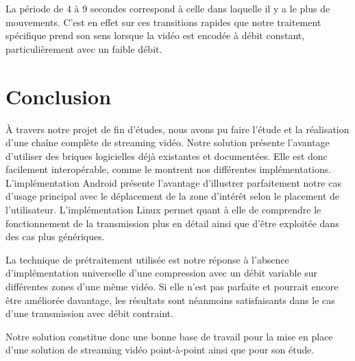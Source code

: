 \documentclass[11pt,a4paper]{article}
\begin{document}
\bigbreak
La période de 4 à 9 secondes correspond à celle dans laquelle il y a le plus de mouvements.
C'est en effet sur ces transitions rapides que notre traitement spécifique prend son sens lorsque la vidéo est encodée à débit constant, particulièrement avec un faible débit.

\section{Conclusion}
À travers notre projet de fin d'études, nous avons pu faire l'étude et la réalisation d'une chaîne complète de streaming vidéo.
Notre solution présente l'avantage d'utiliser des briques logicielles déjà existantes et documentées.
Elle est donc facilement interopérable, comme le montrent nos différentes implémentations.
L'implémentation Android présente l'avantage d'illustrer parfaitement notre cas d'usage principal avec le déplacement de la zone d'intérêt selon le placement de l'utilisateur.
L'implémentation Linux permet quant à elle de comprendre le fonctionnement de la transmission plus en détail ainsi que d'être exploitée dans des cas plus génériques.

\bigbreak
La technique de prétraitement utilisée est notre réponse à l'absence d'implémentation universelle d'une compression avec un débit variable sur différentes zones d'une même vidéo.
Si elle n'est pas parfaite et pourrait encore être améliorée davantage, les résultats sont néanmoins satisfaisants dans le cas d'une transmission avec débit contraint.

\bigbreak
Notre solution constitue donc une bonne base de travail pour la mise en place d'une solution de streaming vidéo point-à-point ainsi que pour son étude.
\end{document}
